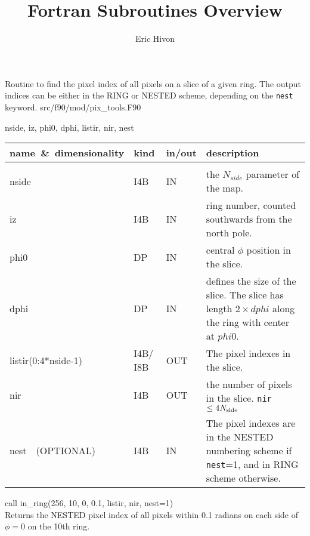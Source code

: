 
\sloppy


\title{\healpix Fortran Subroutines Overview}
 \section[in\_ring]{ }
\label{sub:in_ring}
\author{Eric Hivon}

\begin{facility}
{Routine to find the pixel index of all pixels on a slice of a given
ring. The output indices can be either in the RING or NESTED scheme,
depending on the {\tt nest} keyword.}
{src/f90/mod/pix\_tools.F90}
\end{facility}

\begin{f90format}
{nside, iz, phi0, dphi, listir, nir, nest}
\end{f90format}

\begin{arguments}
{
\begin{tabular}{p{0.4\hsize} p{0.05\hsize} p{0.1\hsize} p{0.35\hsize}} \hline  
\textbf{name~\&~dimensionality} & \textbf{kind} & \textbf{in/out} & \textbf{description} \\ \hline
                   &   &   &                           \\ %
nside & I4B & IN & the $N_{side}$ parameter of the map. \\
iz & I4B & IN & ring number, counted southwards from the north pole. \\
phi0 & DP & IN & central $\phi$ position in the slice. \\
dphi & DP & IN & defines the size of the slice. The slice has length $2\times dphi$ along the ring with center at $phi0$. \\ 
listir(0:4*nside-1) & I4B/ I8B & OUT & The pixel indexes in the slice. \\
nir & I4B & OUT & the number of pixels in the slice. {\tt nir}$\le 4{N_{\rm side}}$\\
nest\ \ (OPTIONAL) & I4B & IN &  The pixel indexes are in the NESTED numbering
scheme if {\tt nest}=1, and in RING scheme otherwise. \\
\end{tabular}
}
\end{arguments}

\begin{example}
{
call in\_ring(256, 10, 0, 0.1, listir, nir, nest=1)  \\
}
{
Returns the NESTED pixel index of all pixels within 0.1 radians on each side of $\phi=0$ on the 10th ring.
}
\end{example}

